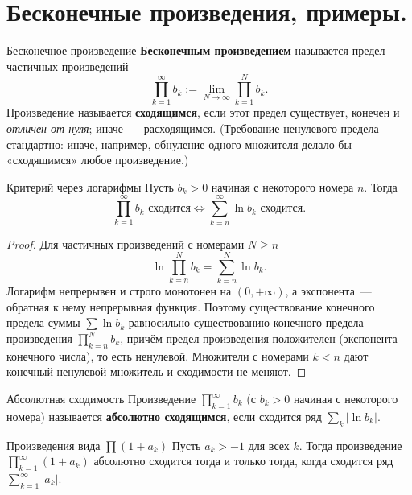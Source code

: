 
\section{Бесконечные произведения, примеры.}

\begin{Definition}{Бесконечное произведение}{}
	\textbf{Бесконечным произведением} называется предел частичных произведений
	\[
	\prod_{k=1}^{\infty} b_k := \lim_{N \to \infty} \prod_{k=1}^{N} b_k.
	\]
	Произведение называется \textbf{сходящимся}, если этот предел существует, конечен и \emph{отличен от нуля}; иначе~--- расходящимся. (Требование ненулевого предела стандартно: иначе, например, обнуление одного множителя делало бы «сходящимся» любое произведение.)
\end{Definition}

\begin{Statement}{Критерий через логарифмы}{}
	Пусть $b_k > 0$ начиная с некоторого номера $n$. Тогда
	\[
	\prod_{k=1}^{\infty} b_k \text{ сходится} \iff \sum_{k=n}^{\infty} \ln b_k \text{ сходится.}
	\]
\end{Statement}

\begin{proof}
	Для частичных произведений с номерами $N \ge n$
	\[
	\ln \prod_{k=n}^{N} b_k = \sum_{k=n}^{N} \ln b_k.
	\]
	Логарифм непрерывен и строго монотонен на $(0, +\infty)$, а экспонента~--- обратная к нему непрерывная функция. Поэтому существование конечного предела суммы $\sum \ln b_k$ равносильно существованию конечного предела произведения $\prod_{k=n}^{N} b_k$, причём предел произведения положителен (экспонента конечного числа), то есть ненулевой. Множители с номерами $k < n$ дают конечный ненулевой множитель и сходимости не меняют.
\end{proof}

\begin{Definition}{Абсолютная сходимость}{}
	Произведение $\prod_{k=1}^{\infty} b_k$ (с $b_k > 0$ начиная с некоторого номера) называется \textbf{абсолютно сходящимся}, если сходится ряд $\sum_k |\ln b_k|$.
\end{Definition}

\begin{Corollary}{Произведения вида $\prod(1 + a_k)$}{}
	Пусть $a_k > -1$ для всех $k$. Тогда произведение $\prod_{k=1}^{\infty} (1 + a_k)$ абсолютно сходится тогда и только тогда, когда сходится ряд $\sum_{k=1}^{\infty} |a_k|$.
\end{Corollary}


